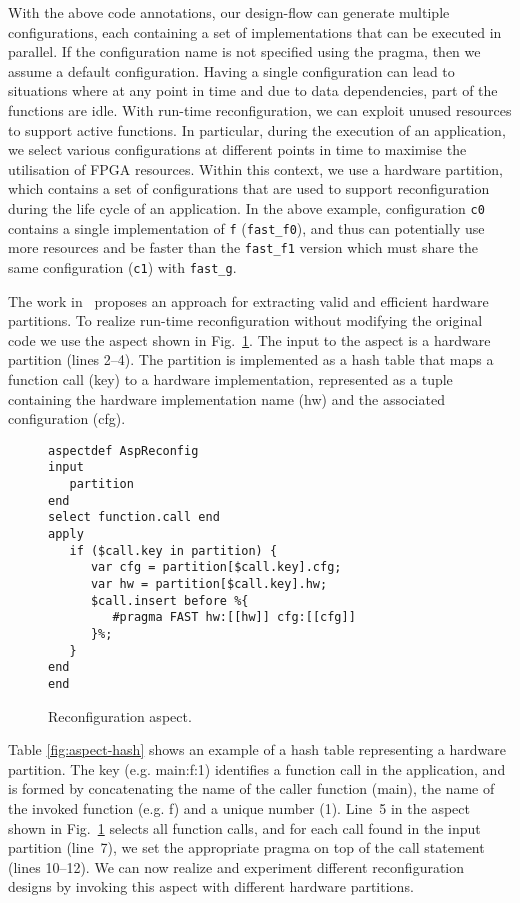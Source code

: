 \noindent With the above code annotations, our design-flow can
generate multiple configurations, each containing a set of \FAST{}
implementations that can be executed in parallel. If the configuration
name is not specified using the \FAST{} pragma, then we assume a
default configuration. Having a single configuration can lead to
situations where at any point in time and due to data dependencies,
part of the functions are idle. With run-time reconfiguration, we can
exploit unused resources to support active functions. In particular,
during the execution of an application, we select various
configurations at different points in time to maximise the utilisation
of FPGA resources. Within this context, we use a hardware partition,
which contains a set of configurations that are used to support
reconfiguration during the life cycle of an application. In the above
example, configuration \texttt{c0} contains a single implementation of
\texttt{f} (\texttt{fast\_f0}), and thus can potentially use more
resources and be faster than the \texttt{fast\_f1} version which must
share the same configuration (\texttt{c1}) with \texttt{fast\_g}.

The work in~\cite{Xinyu:Qiwei:Luk:Qiang:Pell:2012} proposes an
approach for extracting valid and efficient hardware partitions. To realize
run-time reconfiguration without modifying the original code we use the
aspect shown in Fig.~\ref{fig:aspect-reconf}.  The input to the
aspect is a hardware partition (lines 2--4). The partition is implemented as a
hash table that maps a function call (key) to a hardware
implementation, represented as a tuple containing the hardware
implementation name (hw) and the associated configuration (cfg).

\lstset{style=lara}
\begin{figure}[!h]
\begin{lstlisting}
aspectdef AspReconfig
input
   partition
end
select function.call end
apply
   if ($call.key in partition) {
      var cfg = partition[$call.key].cfg;
      var hw = partition[$call.key].hw;
      $call.insert before %{
         #pragma FAST hw:[[hw]] cfg:[[cfg]]
      }%;
   }
end
end
\end{lstlisting}
\caption{Reconfiguration aspect.}
\label{fig:aspect-reconf}
\end{figure}

Table \ref{fig:aspect-hash} shows an example of a hash table
representing a hardware partition. The key (e.g. main:f:1) identifies
a function call in the application, and is formed by concatenating the
name of the caller function (main), the name of the invoked function
(e.g. f) and a unique number (1).  Line~5 in the aspect shown in
Fig.~\ref{fig:aspect-reconf} selects all function calls, and for each
call found in the input partition (line~7), we set the appropriate
pragma on top of the call statement (lines 10--12). We can now realize
and experiment different reconfiguration designs by invoking this
aspect with different hardware partitions.



